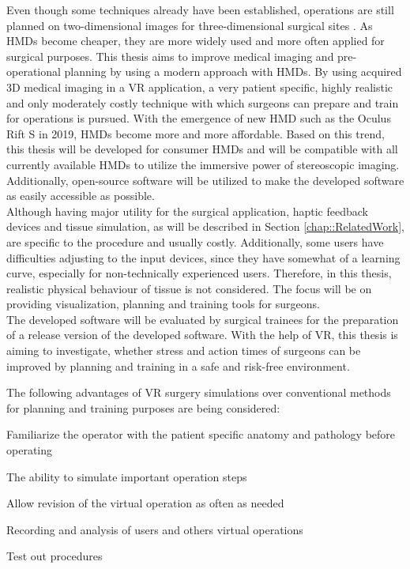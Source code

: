 Even though some techniques already have been established, operations are still planned on two-dimensional images for three-dimensional surgical sites \cite{Steinbacher.2015}.
As HMDs become cheaper, they are more widely used and more often applied for surgical purposes.
This thesis aims to improve medical imaging and pre-operational planning by using a modern approach with HMDs.
By using acquired 3D medical imaging in a VR application, a very patient specific, highly realistic and only moderately costly technique with which surgeons can prepare and 
train for operations is pursued.
With the emergence of new HMD such as the Oculus Rift S in 2019, HMDs become more and more affordable.
Based on this trend, this thesis will be developed for consumer HMDs and will be compatible with all currently available HMDs to utilize the immersive power of stereoscopic imaging.
Additionally, open-source software will be utilized to make the developed software as easily accessible as possible. 
\\ Although having major utility for the surgical application, haptic feedback devices and tissue simulation, as will be described in Section \ref{chap::RelatedWork}, are specific to the procedure and usually costly.
Additionally, some users have difficulties adjusting to the input devices, since they have somewhat of a learning curve, especially for non-technically experienced users.
Therefore, in this thesis, realistic physical behaviour of tissue is not considered.
The focus will be on providing visualization, planning and training tools for surgeons.
\\ The developed software will be evaluated by surgical trainees for the preparation of a release version of the developed software.
With the help of VR, this thesis is aiming to investigate, whether stress and action times of surgeons can be improved by planning and training in a safe and risk-free environment.

The following advantages of VR surgery simulations over conventional methods for planning and training purposes are being considered:
\begin{compactenum}[label=(\alph*)]
    \item Familiarize the operator with the patient specific anatomy and pathology before operating
    \item The ability to simulate important operation steps
    \item Allow revision of the virtual operation as often as needed
    \item Recording and analysis of users and others virtual operations
    \item Test out procedures
\end{compactenum}

